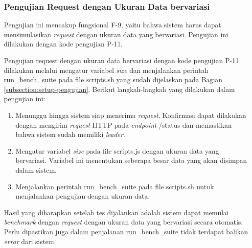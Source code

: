 \subsubsection{Pengujian Request dengan Ukuran Data bervariasi}
\label{subsubsection:pengujian-request-ukuran-data}

Pengujian ini mencakup fungsional F-9, yaitu bahwa sistem harus dapat mensimulasikan \textit{request} dengan ukuran data yang bervariasi. Pengujian ini dilakukan dengan kode pengujian P-11.

Pengujian request dengan ukuran data bervariasi dengan kode pengujian P-11 dilakukan melalui mengatur variabel \textit{size} dan menjalankan perintah run\_bench\_suite pada file scripts.sh yang sudah dijelaskan pada Bagian \ref{subsection:setup-pengujian}. Berikut langkah-langkah yang dilakukan dalam pengujian ini:

\begin{enumerate}
	\item Menunggu hingga sistem siap menerima \textit{request}. Konfirmasi dapat dilakukan dengan mengirim \textit{request} HTTP pada \textit{endpoint} /status dan memastikan bahwa sistem sudah memiliki \textit{leader}.
	\item Mengatur variabel \textit{size} pada file scripts.js dengan ukuran data yang bervariasi. Variabel ini menentukan seberapa besar data yang akan disimpan dalam sistem.
	\item Menjalankan perintah run\_bench\_suite pada file scripts.sh untuk menjalankan pengujian dengan ukuran data.
\end{enumerate}

Hasil yang diharapkan setelah tes dijalankan adalah sistem dapat memulai \textit{benchmark} dengan \textit{request} dengan ukuran data yang bervariasi secara otomatis. Perlu dipastikan juga dalam penjalanan run\_bench\_suite tidak terdapat balikan \textit{error} dari sistem.